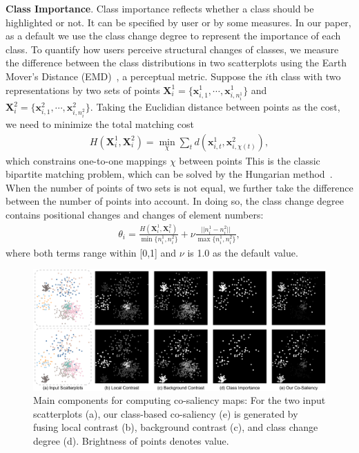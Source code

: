 \vspace{1.5mm}
\noindent\textbf{Class Importance}.
Class importance reflects whether a class should be highlighted or not. It can be specified by user or by some measures. In our paper, as a default we use the class change degree to represent the importance of each class.
To quantify how users perceive structural changes of classes, we measure the difference between the class distributions in two scatterplots using the Earth Mover's Distance (EMD)~\cite{rubner2000earth}, a perceptual metric.
Suppose the $i$th  class with two representations by two sets of points $\mathbf{X}^1_i = \{\mathbf{x}_{i,1}^1, \cdots , \mathbf{x}_{i,n^1_i}^1\}$ and $\mathbf{X}^2_i = \{\mathbf{x}_{i,1}^2, \cdots , \mathbf{x}_{i,n^2_i}^2\}$.
Taking the Euclidian distance between points as the cost, we need to  minimize the total matching cost
\begin{align}
 H(\mathbf{X}^1_i, \mathbf{X}^2_i)  = \min_\chi \sum_t d(\mathbf{x}_{i,t}^1, \mathbf{x}_{i,\chi(t)}^2), \nonumber
\end{align}
which constrains one-to-one mappings $\chi$ between points %
This is the classic bipartite matching problem, which can be solved by the Hungarian method~\cite{kuhn1955hungarian}.
When the number of points of two sets is not equal, we further take the difference between the number of points into account. In doing so, the class change degree contains  positional changes and changes of element numbers:
\begin{align}\label{eq:cm}
 \theta_i= \frac{H(\mathbf{X}^1_i, \mathbf{X}^2_i) }{\min\{n^1_i, n^2_i\}} + \nu \frac{||n^1_i- n^2_i||}{\max\{n^1_i, n^2_i\}},
\end{align}
where both terms range within [0,1] and $\nu$ is 1.0 as the default value.


\begin{figure}[!tb]
\centering
\includegraphics[width=\linewidth]{figures/saliencymap}
\caption{Main components for computing co-saliency maps: For the two input scatterplots (a), our class-based co-saliency (e) is generated by fusing  local contrast (b),  background contrast (c),  and class change degree (d). Brightness of points denotes value.
}
\vspace*{-3mm}
\label{fig:map}
\end{figure}
\vspace{1.5mm}

